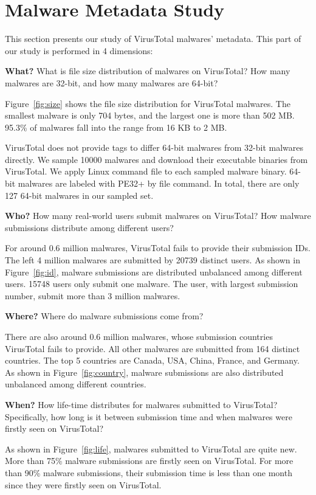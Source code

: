 \section{Malware Metadata Study}
\label{sec:meta}

This section presents our study of VirusTotal malwares' metadata. 
This part of our study is performed in 4 dimensions:

{\bf What?} What is file size distribution of malwares on VirusTotal? 
How many malwares are 32-bit, and how many malwares are 64-bit? 



Figure~\ref{fig:size} shows the file size distribution for VirusTotal malwares. 
The smallest malware is only 704 bytes, and the largest one is more than 502 MB. 
95.3\% of malwares fall into the range from 16 KB to 2 MB. 

VirusTotal does not provide tags to differ 64-bit malwares from 32-bit malwares directly. 
We sample 10000 malwares and download their executable binaries from VirusTotal.
We apply Linux command file to each sampled malware binary. 
64-bit malwares are labeled with PE32+ by file command. 
In total, there are only 127 64-bit malwares in our sampled set. 

{\bf Who?} How many real-world users submit malwares on VirusTotal? 
How malware submissions distribute among different users? 



For around 0.6 million malwares, VirusTotal fails to provide their submission IDs. 
The left 4 million malwares are submitted by 20739 distinct users.
As shown in Figure~\ref{fig:id}, malware submissions are distributed unbalanced among different users.
15748 users only submit one malware. 
The user, with largest submission number, submit more than 3 million malwares. 

{\bf Where?} Where do malware submissions come from? 



There are also around 0.6 million malwares, 
whose submission countries VirusTotal fails to provide. 
All other malwares are submitted from 164 distinct countries. 
The top 5 countries are Canada, USA, China, France, and Germany. 
As shown in Figure~\ref{fig:country}, 
malware submissions are also distributed unbalanced among different countries. 

{\bf When?} How life-time distributes for malwares submitted to VirusTotal? 
Specifically, how long is it between submission time and when malwares were firstly seen on VirusTotal?



As shown in Figure~\ref{fig:life}, malwares submitted to VirusTotal are quite new. 
More than 75\% malware submissions are firstly seen on VirusTotal.
For more than 90\% malware submissions, 
their submission time is less than one month since they were firstly seen on VirusTotal.  